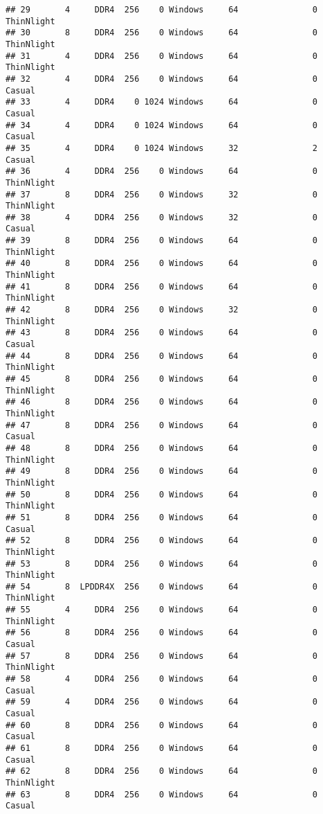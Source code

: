 \documentclass[
]{article}
\begin{document}
\begin{verbatim}
## 29       4     DDR4  256    0 Windows     64               0 ThinNlight
## 30       8     DDR4  256    0 Windows     64               0 ThinNlight
## 31       4     DDR4  256    0 Windows     64               0 ThinNlight
## 32       4     DDR4  256    0 Windows     64               0     Casual
## 33       4     DDR4    0 1024 Windows     64               0     Casual
## 34       4     DDR4    0 1024 Windows     64               0     Casual
## 35       4     DDR4    0 1024 Windows     32               2     Casual
## 36       4     DDR4  256    0 Windows     64               0 ThinNlight
## 37       8     DDR4  256    0 Windows     32               0 ThinNlight
## 38       4     DDR4  256    0 Windows     32               0     Casual
## 39       8     DDR4  256    0 Windows     64               0 ThinNlight
## 40       8     DDR4  256    0 Windows     64               0 ThinNlight
## 41       8     DDR4  256    0 Windows     64               0 ThinNlight
## 42       8     DDR4  256    0 Windows     32               0 ThinNlight
## 43       8     DDR4  256    0 Windows     64               0     Casual
## 44       8     DDR4  256    0 Windows     64               0 ThinNlight
## 45       8     DDR4  256    0 Windows     64               0 ThinNlight
## 46       8     DDR4  256    0 Windows     64               0 ThinNlight
## 47       8     DDR4  256    0 Windows     64               0     Casual
## 48       8     DDR4  256    0 Windows     64               0 ThinNlight
## 49       8     DDR4  256    0 Windows     64               0 ThinNlight
## 50       8     DDR4  256    0 Windows     64               0 ThinNlight
## 51       8     DDR4  256    0 Windows     64               0     Casual
## 52       8     DDR4  256    0 Windows     64               0 ThinNlight
## 53       8     DDR4  256    0 Windows     64               0 ThinNlight
## 54       8  LPDDR4X  256    0 Windows     64               0 ThinNlight
## 55       4     DDR4  256    0 Windows     64               0 ThinNlight
## 56       8     DDR4  256    0 Windows     64               0     Casual
## 57       8     DDR4  256    0 Windows     64               0 ThinNlight
## 58       4     DDR4  256    0 Windows     64               0     Casual
## 59       4     DDR4  256    0 Windows     64               0     Casual
## 60       8     DDR4  256    0 Windows     64               0     Casual
## 61       8     DDR4  256    0 Windows     64               0     Casual
## 62       8     DDR4  256    0 Windows     64               0 ThinNlight
## 63       8     DDR4  256    0 Windows     64               0     Casual

\end{verbatim}
\end{document}
